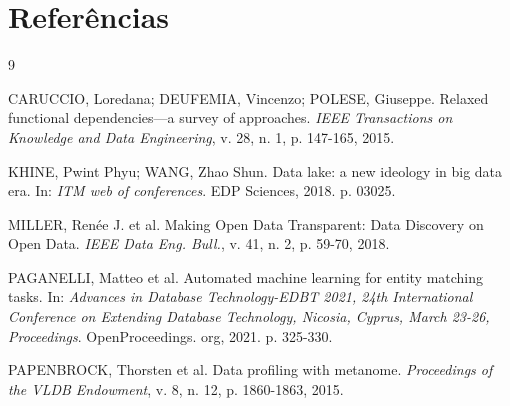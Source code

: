 \documentclass[12pt, a4paper]{article}
\begin{document}
\newpage
\section{Referências} 
\label{sec:referencias}
\renewcommand{\refname}{} 
\begin{thebibliography}{9}

CARUCCIO, Loredana; DEUFEMIA, Vincenzo; POLESE, Giuseppe. Relaxed functional dependencies—a survey of approaches.
\textit{IEEE Transactions on Knowledge and Data Engineering}, v. 28, n. 1, p. 147-165, 2015. 

KHINE, Pwint Phyu; WANG, Zhao Shun. Data lake: a new ideology in big data era. In: \textit{ITM web of conferences}.
EDP Sciences, 2018. p. 03025. 

MILLER, Renée J. et al. Making Open Data Transparent: Data Discovery on Open Data. \textit{IEEE Data Eng.
Bull.}, v. 41, n. 2, p. 59-70, 2018. 

PAGANELLI, Matteo et al. Automated machine learning for entity matching tasks.
In: \textit{Advances in Database Technology-EDBT 2021, 24th International Conference on Extending Database Technology, Nicosia, Cyprus, March 23-26, Proceedings}. OpenProceedings.
org, 2021. p. 325-330.

PAPENBROCK, Thorsten et al. Data profiling with metanome. \textit{Proceedings of the VLDB Endowment}, v. 8, n. 12, p. 1860-1863, 2015.

\end{thebibliography}
\end{document}
